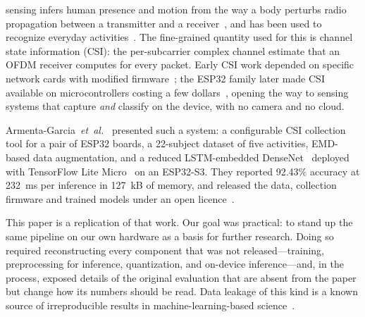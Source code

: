 \documentclass[journal]{IEEEtran}
\begin{document}
 sensing infers human presence and motion from the way a body
perturbs radio propagation between a transmitter and a receiver~\cite{ma2019survey},
and has been used to recognize everyday activities~\cite{wang2015carm}.
The fine-grained quantity used for this is channel state information (CSI): the
per-subcarrier complex channel estimate that an OFDM receiver computes for every
packet. Early CSI work depended on specific network cards with modified
firmware~\cite{halperin2011tool}; the ESP32 family later made CSI available on
microcontrollers costing a few dollars~\cite{hernandez2020esp32}, opening the way to
sensing systems that capture \emph{and} classify on the device, with no camera and no
cloud.

Armenta-Garcia~\textit{et~al.}~\cite{armenta2025tools} presented such a system: a
configurable CSI collection tool for a pair of ESP32 boards, a 22-subject dataset of
five activities, EMD-based data augmentation, and a reduced LSTM-embedded
DenseNet~\cite{huang2017densenet,hochreiter1997lstm} deployed with TensorFlow Lite
Micro~\cite{david2021tflm} on an ESP32-S3. They reported 92.43\% accuracy at 232~ms
per inference in 127~kB of memory, and released the data, collection firmware and
trained models under an open licence~\cite{armenta2025repo}.

This paper is a replication of that work. Our goal was practical: to stand up the
same pipeline on our own hardware as a basis for further research. Doing so required
reconstructing every component that was not released---training, preprocessing for
inference, quantization, and on-device inference---and, in the process, exposed
details of the original evaluation that are absent from the paper but change how its
numbers should be read. Data leakage of this kind is a known source of irreproducible
results in machine-learning-based science~\cite{kapoor2023leakage}.
\end{document}

